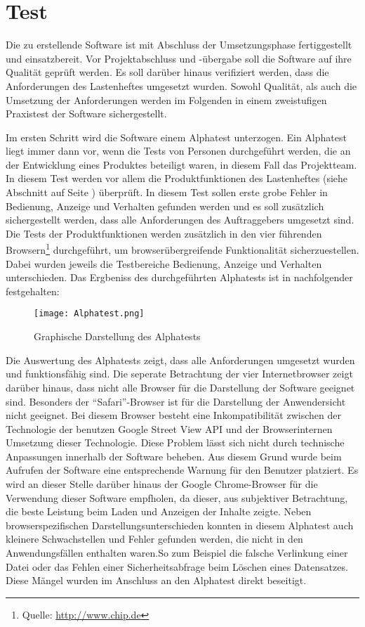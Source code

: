 \section{Test}
\label{sec:Test}

Die zu erstellende Software ist mit Abschluss der Umsetzungsphase fertiggestellt und einsatzbereit. Vor Projektabschluss und -übergabe soll die Software auf ihre Qualität geprüft werden. Es soll darüber hinaus verifiziert werden, dass die Anforderungen des Lastenheftes umgesetzt wurden. Sowohl Qualität, als auch die Umsetzung der Anforderungen werden im Folgenden in einem zweistufigen Praxistest der Software sichergestellt.

Im ersten Schritt wird die Software einem Alphatest unterzogen. Ein Alphatest liegt immer dann vor, wenn die Tests von Personen durchgeführt werden, die an der Entwicklung eines Produktes beteiligt waren, in diesem Fall das Projektteam. In diesem Test werden vor allem die Produktfunktionen des Lastenheftes (siehe Abschnitt  auf Seite \pageref{sec:Lastenheft}) überprüft. In diesem Test sollen erste grobe Fehler in Bedienung, Anzeige und Verhalten gefunden werden und es soll zusätzlich sichergestellt werden, dass alle Anforderungen des Auftraggebers umgesetzt sind. Die Tests der Produktfunktionen werden zusätzlich in den vier führenden Browsern\footnote{Quelle: \url{http://www.chip.de}} durchgeführt, um browserübergreifende Funktionalität sicherzuestellen.
Dabei wurden jeweils die Testbereiche Bedienung, Anzeige und Verhalten unterschieden. Das Ergbeniss des durchgeführten Alphatests ist in nachfolgender  festgehalten:

\begin{figure}[htb]
\centering
\texttt{[image: Alphatest.png]}
\caption[Mockup Backend]{Graphische Darstellung des Alphatests\protect\footnotemark}
\label{fig:Alphatest}
\end{figure}

Die Auswertung des Alphatests zeigt, dass alle Anforderungen umgesetzt wurden und funktionsfähig sind. Die seperate Betrachtung der vier Internetbrowser zeigt darüber hinaus, dass nicht alle Browser für die Darstellung der Software geeignet sind. Besonders der "`Safari"'-Browser ist für die Darstellung der Anwendersicht nicht geeignet. Bei diesem Browser besteht eine Inkompatibilität zwischen der Technologie der benutzen Google Street View API und der Browserinternen Umsetzung dieser Technologie. Diese Problem lässt sich nicht durch technische Anpassungen innerhalb der Software beheben. Aus diesem Grund wurde beim Aufrufen der Software eine entsprechende Warnung für den Benutzer platziert. Es wird an dieser Stelle darüber hinaus der Google Chrome-Browser für die Verwendung dieser Software empfholen, da dieser, aus subjektiver Betrachtung, die beste Leistung beim Laden und Anzeigen der Inhalte zeigte. Neben browserspezifischen Darstellungsunterschieden konnten in diesem Alphatest auch kleinere Schwachstellen und Fehler gefunden werden, die nicht in den Anwendungsfällen enthalten waren.So zum Beispiel die falsche Verlinkung einer Datei oder das Fehlen einer Sicherheitsabfrage beim Löschen eines Datensatzes. Diese Mängel wurden im Anschluss an den Alphatest direkt beseitigt.